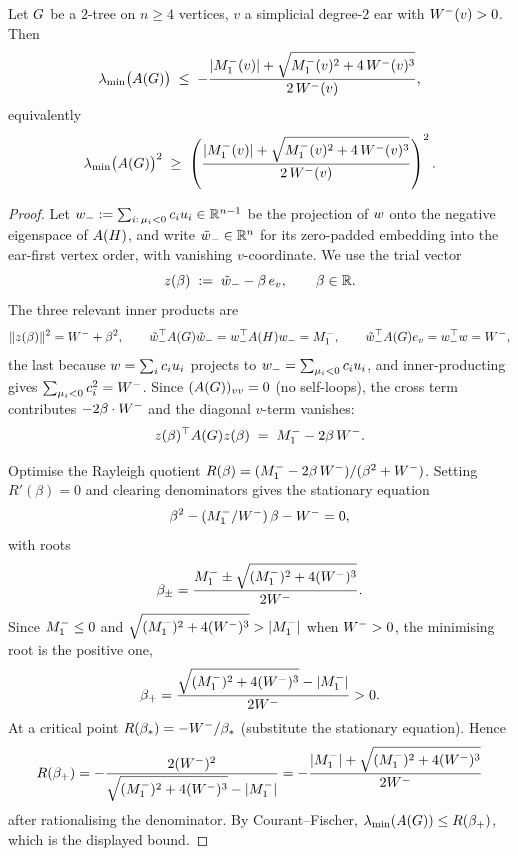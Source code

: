 \begin{lemma}\label{lem:B1}
Let $G$ be a $2$-tree on $n \ge 4$ vertices, $v$ a simplicial
degree-$2$ ear with $W^{-}(v) > 0$. Then
\[
\lambda_{\min}\bigl(A(G)\bigr) \;\le\;
-\frac{|M_{1}^{-}(v)| + \sqrt{M_{1}^{-}(v)^{2} + 4\, W^{-}(v)^{3}}}{2\, W^{-}(v)},
\]
equivalently
\[
\lambda_{\min}\bigl(A(G)\bigr)^{2}
\;\ge\; \left(\frac{|M_{1}^{-}(v)| + \sqrt{M_{1}^{-}(v)^{2} + 4\, W^{-}(v)^{3}}}{2\, W^{-}(v)}\right)^{2}.
\]
\end{lemma}

\begin{proof}
Let $w_{-} := \sum_{i:\, \mu_{i} < 0} c_{i} u_{i} \in
\mathbb{R}^{n-1}$ be the projection of $w$ onto the negative
eigenspace of $A(H)$, and write $\tilde {w}_{-} \in
\mathbb{R}^{n}$ for its zero-padded embedding into the ear-first
vertex order, with vanishing $v$-coordinate. We use the trial vector
\[
z(\beta) \;:=\; \tilde {w}_{-} - \beta\, e_{v}, \qquad \beta \in \mathbb{R}.
\]
The three relevant inner products are
\[
\|z(\beta)\|^{2} = W^{-} + \beta^{2},
\qquad
\tilde {w}_{-}^{\top} A(G) \tilde {w}_{-} = w_{-}^{\top} A(H) w_{-} = M_{1}^{-},
\qquad
\tilde {w}_{-}^{\top} A(G) e_{v} = w_{-}^{\top} w = W^{-},
\]
the last because $w = \sum_{i} c_{i} u_{i}$ projects to
$w_{-} = \sum_{\mu_{i} < 0} c_{i} u_{i}$, and inner-producting
gives $\sum_{\mu_{i} < 0} c_{i}^{2} = W^{-}$. Since
$(A(G))_{vv} = 0$ (no self-loops), the cross term contributes
$-2\beta \cdot W^{-}$ and the diagonal $v$-term vanishes:
\[
z(\beta)^{\top} A(G) z(\beta) \;=\; M_{1}^{-} - 2\beta\, W^{-}.
\]

Optimise the Rayleigh quotient
$R(\beta) = (M_{1}^{-} - 2\beta\,W^{-})/(\beta^{2} + W^{-})$. Setting
$R'(\beta) = 0$ and clearing denominators gives the stationary equation
\[
\beta^{2} - (M_{1}^{-}/W^{-})\,\beta - W^{-} = 0,
\]
with roots
\[
\beta_{\pm} = \frac{M_{1}^{-} \pm \sqrt{(M_{1}^{-})^{2} + 4 (W^{-})^{3}}}{2W^{-}}.
\]
Since $M_{1}^{-} \le 0$ and $\sqrt{(M_{1}^{-})^{2} + 4(W^{-})^{3}} > |M_{1}^{-}|$
when $W^{-} > 0$, the minimising root is the positive one,
\[
\beta_{+} = \frac{\sqrt{(M_{1}^{-})^{2} + 4 (W^{-})^{3}} - |M_{1}^{-}|}{2W^{-}}
> 0.
\]
At a critical point $R(\beta_{*}) = -W^{-}/\beta_{*}$ (substitute the
stationary equation). Hence
\[
R(\beta_{+}) = -\frac{2(W^{-})^{2}}{\sqrt{(M_{1}^{-})^{2} + 4(W^{-})^{3}} - |M_{1}^{-}|}
= -\frac{|M_{1}^{-}| + \sqrt{(M_{1}^{-})^{2} + 4(W^{-})^{3}}}{2W^{-}}
\]
after rationalising the denominator. By Courant--Fischer,
$\lambda_{\min}(A(G)) \le R(\beta_{+})$, which is the displayed
bound.
\end{proof}

